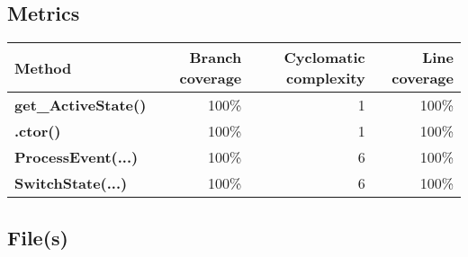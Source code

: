 \documentclass[a4paper,landscape,10pt]{article}
\begin{document}
\subsection{Metrics}
\begin{longtable}[l]{|l|r|r|r|}
\hline
\textbf{Method} & \textbf{Branch coverage} & \textbf{Cyclomatic complexity} & \textbf{Line coverage}\\
\hline
\textbf{get\_ActiveState()} & 100\% & 1 & 100\%\\
\hline
\textbf{.ctor()} & 100\% & 1 & 100\%\\
\hline
\textbf{ProcessEvent(...)} & 100\% & 6 & 100\%\\
\hline
\textbf{SwitchState(...)} & 100\% & 6 & 100\%\\
\hline
\end{longtable}
\subsection{File(s)}
\end{document}
